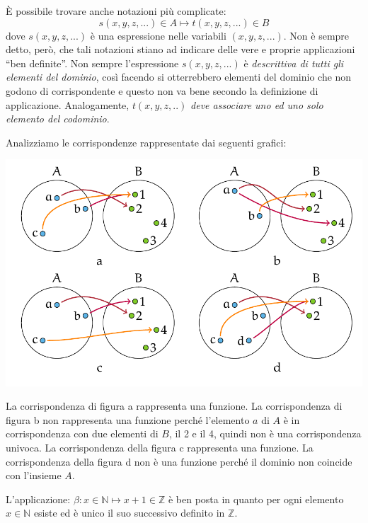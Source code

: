 È possibile trovare anche notazioni più complicate:
$$
s(x,y,z,...) \in A \mapsto t(x,y,z,...) \in B
$$
dove $s(x,y,z,...)$ è una espressione nelle variabili $(x,y,z,...)$. Non è sempre detto, però, che tali notazioni stiano ad indicare delle vere e proprie applicazioni ``ben definite''. Non sempre l'espressione $s(x,y,z,...)$ è \textit{descrittiva di tutti gli elementi del dominio}, così facendo si otterrebbero elementi del dominio che non godono di corrispondente e questo non va bene secondo la definizione di applicazione. Analogamente, $t(x,y,z,..)$ \textit{deve associare uno ed uno solo elemento del codominio}.

\begin{example}
	Analizziamo le corrispondenze rappresentate dai seguenti grafici:
	\begin{center}
		\includegraphics[scale=.55]{res/Corrispondenze_applicazioni.png}
	\end{center}
	La corrispondenza di figura a rappresenta una funzione.
	La corrispondenza di figura b non rappresenta una funzione perché l’elemento $a$ di $A$ è in corrispondenza con due elementi di $B$, il 2 e il 4, quindi non è una corrispondenza univoca. La corrispondenza della figura c rappresenta una funzione. La corrispondenza della figura d non è una funzione perché il dominio non coincide con l’insieme $A$.
\end{example}

\begin{example}
	L'applicazione: $\beta: x \in \mathbb{N} \mapsto x+1 \in \mathbb{Z}$ è ben posta in quanto per ogni elemento $x \in \mathbb{N}$ esiste ed è unico il suo successivo definito in $\mathbb{Z}$.
\end{example}

